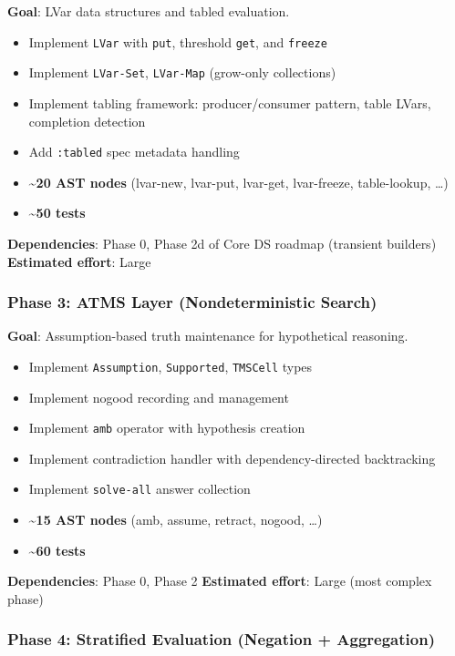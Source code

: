 \documentclass[11pt]{article}
\begin{document}
\textbf{Goal}: LVar data structures and tabled evaluation.

\begin{itemize}
\item Implement \texttt{LVar} with \texttt{put}, threshold \texttt{get}, and \texttt{freeze}
\item Implement \texttt{LVar-Set}, \texttt{LVar-Map} (grow-only collections)
\item Implement tabling framework: producer/consumer pattern, table LVars,
completion detection
\item Add \texttt{:tabled} spec metadata handling
\item \textbf{\textasciitilde{}20 AST nodes} (lvar-new, lvar-put, lvar-get, lvar-freeze, table-lookup, \ldots{})
\item \textbf{\textasciitilde{}50 tests}
\end{itemize}

\textbf{Dependencies}: Phase 0, Phase 2d of Core DS roadmap (transient builders)
\textbf{Estimated effort}: Large
\subsubsection{Phase 3: ATMS Layer (Nondeterministic Search)}
\label{sec:orgc29260c}

\textbf{Goal}: Assumption-based truth maintenance for hypothetical reasoning.

\begin{itemize}
\item Implement \texttt{Assumption}, \texttt{Supported}, \texttt{TMSCell} types
\item Implement nogood recording and management
\item Implement \texttt{amb} operator with hypothesis creation
\item Implement contradiction handler with dependency-directed backtracking
\item Implement \texttt{solve-all} answer collection
\item \textbf{\textasciitilde{}15 AST nodes} (amb, assume, retract, nogood, \ldots{})
\item \textbf{\textasciitilde{}60 tests}
\end{itemize}

\textbf{Dependencies}: Phase 0, Phase 2
\textbf{Estimated effort}: Large (most complex phase)
\subsubsection{Phase 4: Stratified Evaluation (Negation + Aggregation)}
\label{sec:orgb5ed10a}
\end{document}
